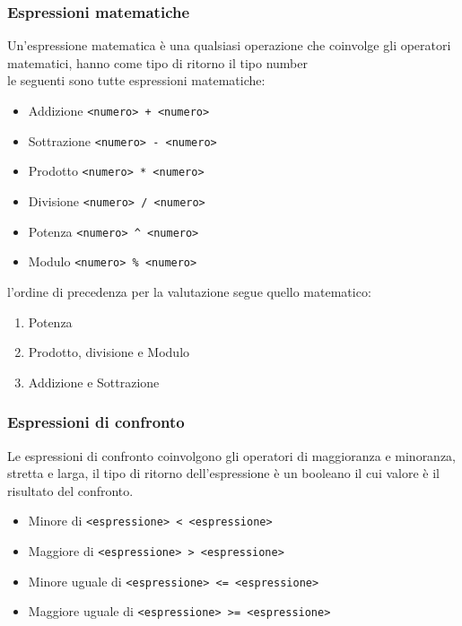 \subsubsection{Espressioni matematiche}
Un'espressione matematica è una qualsiasi operazione che coinvolge gli operatori matematici,
hanno come tipo di ritorno il tipo number
\\
le seguenti sono tutte espressioni matematiche:
\begin{itemize}
    \item Addizione \lstinline|<numero> + <numero>|
    \item Sottrazione \lstinline|<numero> - <numero>|
    \item Prodotto \lstinline|<numero> * <numero>|
    \item Divisione \lstinline|<numero> / <numero>|
    \item Potenza \lstinline|<numero> ^ <numero>|
    \item Modulo \lstinline|<numero> % <numero>|
\end{itemize}
l'ordine di precedenza per la valutazione segue quello matematico:
\begin{enumerate}
    \item Potenza
    \item Prodotto, divisione e Modulo
    \item Addizione e Sottrazione
\end{enumerate}

\subsubsection{Espressioni di confronto}
Le espressioni di confronto coinvolgono gli operatori di maggioranza e minoranza, stretta e larga,
il tipo di ritorno dell'espressione è un booleano il cui valore è il risultato del confronto.
\begin{itemize}
    \item Minore di \lstinline|<espressione> < <espressione>|
    \item Maggiore di \lstinline|<espressione> > <espressione>|
    \item Minore uguale di \lstinline|<espressione> <= <espressione>|
    \item Maggiore uguale di \lstinline|<espressione> >= <espressione>|
\end{itemize}


